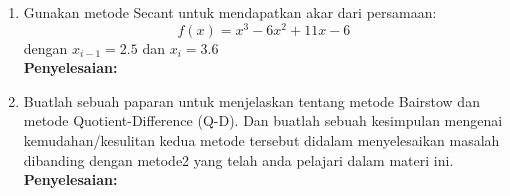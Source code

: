 \documentclass{article}
\newcommand{\penyelesaian}{\textbf{Penyelesaian: }}
\begin{document}
\begin{enumerate}
    \item Gunakan metode Secant untuk mendapatkan akar dari persamaan:
    \begin{equation*}
        f(x) = x^3 - \num{6}x^2 + \num{11}x - \num{6}
    \end{equation*}
    dengan $x_{i-1} = \num{2,5}$ dan $x_i = \num{3,6}$ \\
    \penyelesaian

    \item Buatlah sebuah paparan untuk menjelaskan tentang metode Bairstow dan metode Quotient-Difference (Q-D). 
    Dan buatlah sebuah kesimpulan mengenai kemudahan/kesulitan kedua metode tersebut didalam menyelesaikan masalah dibanding dengan metode2 yang telah anda pelajari dalam materi ini. \\
    \penyelesaian

\end{enumerate}
\end{document}
